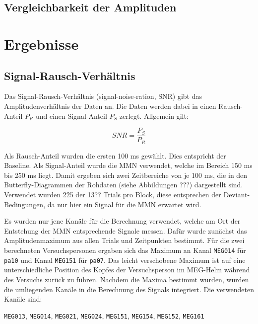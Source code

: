 \documentclass[doc,a4paper,12pt]{apa6}
\begin{document}
\subsection{Vergleichbarkeit der Amplituden}


\newpage
\section{Ergebnisse}
\label{sec:ergebnisse}

\subsection{Signal-Rausch-Verhältnis}
\label{sec:snr}

Das Signal-Rausch-Verhältnis (signal-noise-ration, SNR) gibt das Amplitudenverhältnis der Daten an. Die Daten werden dabei in einen Rausch-Anteil $P_R$ und einen Signal-Anteil $P_S$ zerlegt. Allgemein gilt:

\begin{equation}
SNR = \frac{P_S}{P_R}
\end{equation}

Als Rausch-Anteil wurden die ersten 100 ms gewählt. Dies entspricht der Baseline. Als Signal-Anteil wurde die MMN verwendet, welche im Bereich 150 ms bis 250 ms liegt. Damit ergeben sich zwei Zeitbereiche von je 100 ms, die in den Butterfly-Diagrammen der Rohdaten (siehe Abbildungen ???) dargestellt sind. Verwendet wurden 225 der 13?? Trials pro Block, diese entsprechen der Deviant-Bedingungen, da nur hier ein Signal für die MMN erwartet wird.

Es wurden nur jene Kanäle für die Berechnung verwendet, welche am Ort der Entstehung der MMN entsprechende Signale messen. Dafür wurde zunächst das Amplitudenmaximum aus allen Trials und Zeitpunkten bestimmt. Für die zwei berechneten Versuchspersonen ergaben sich das Maximum an Kanal \texttt{MEG014} für \texttt{pa10} und Kanal \texttt{MEG151} für \texttt{pa07}. Das leicht verschobene Maximum ist auf eine unterschiedliche Position des Kopfes der Versuchsperson im MEG-Helm während des Versuchs zurück zu führen. Nachdem die Maxima bestimmt wurden, wurden die umliegenden Kanäle in die Berechnung des Signals integriert. Die verwendeten Kanäle sind:

\texttt{MEG013}, \texttt{MEG014}, \texttt{MEG021}, \texttt{MEG024}, \texttt{MEG151}, \texttt{MEG154}, \texttt{MEG152}, \texttt{MEG161}
\end{document}
